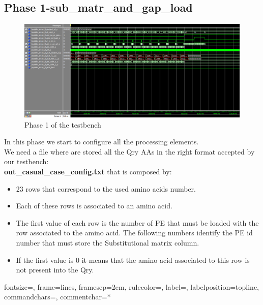 \subsection{Phase 1-sub\_matr\_and\_gap\_load }
\begin{figure}[h!]
	\centering
	\includegraphics[width=\textwidth]{imm/sw/configuration_phase.png} 	\caption{Phase 1 of the testbench} 
	\label{tb_sw_1}
\end{figure}
In this phase we start to configure all the processing elements.\\
We need a file where are stored all the Qry AAs in the right format accepted by our testbench:\\
\textbf{out\_casual\_case\_config.txt} that is composed by:\\
\begin{itemize}
\item 23 rows that correspond to the used amino acids number. 
\item Each of these rows is associated to an amino acid. 
\item The first value of each row is the number of PE that must be loaded with the row associated to the amino acid. The following numbers identify the PE id number that must store the Substitutional matrix column. 
\item If the first value is 0 it means that the amino acid associated to this row is not present into the Qry.
\end{itemize}
\newpage
{}%
{fontsize=\footnotesize,
	frame=lines,  %
	framesep=2em, %
	rulecolor=\color{Gray},
	label=,
	labelposition=topline,
	commandchars=\|\(\), %
	commentchar=*        %
}
 \label{file_pes}

